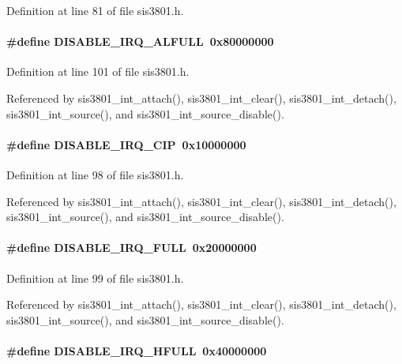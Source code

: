 Definition at line 81 of file sis3801.h.
\paragraph[{DISABLE\_\-IRQ\_\-ALFULL}]{\setlength{\rightskip}{0pt plus 5cm}\#define DISABLE\_\-IRQ\_\-ALFULL~0x80000000}\hfill\label{sis3801_8h_ad4964772785e27e5c5aef46b6187aa5a}


Definition at line 101 of file sis3801.h.

Referenced by sis3801\_\-int\_\-attach(), sis3801\_\-int\_\-clear(), sis3801\_\-int\_\-detach(), sis3801\_\-int\_\-source(), and sis3801\_\-int\_\-source\_\-disable().
\paragraph[{DISABLE\_\-IRQ\_\-CIP}]{\setlength{\rightskip}{0pt plus 5cm}\#define DISABLE\_\-IRQ\_\-CIP~0x10000000}\hfill\label{sis3801_8h_ae7c9598ca47e2097ea4bb6c9b39c5cd8}


Definition at line 98 of file sis3801.h.

Referenced by sis3801\_\-int\_\-attach(), sis3801\_\-int\_\-clear(), sis3801\_\-int\_\-detach(), sis3801\_\-int\_\-source(), and sis3801\_\-int\_\-source\_\-disable().
\paragraph[{DISABLE\_\-IRQ\_\-FULL}]{\setlength{\rightskip}{0pt plus 5cm}\#define DISABLE\_\-IRQ\_\-FULL~0x20000000}\hfill\label{sis3801_8h_a0c1aff27bc224d6bf77187fdc2c29ba1}


Definition at line 99 of file sis3801.h.

Referenced by sis3801\_\-int\_\-attach(), sis3801\_\-int\_\-clear(), sis3801\_\-int\_\-detach(), sis3801\_\-int\_\-source(), and sis3801\_\-int\_\-source\_\-disable().
\paragraph[{DISABLE\_\-IRQ\_\-HFULL}]{\setlength{\rightskip}{0pt plus 5cm}\#define DISABLE\_\-IRQ\_\-HFULL~0x40000000}\hfill\label{sis3801_8h_a16524c516879de51d68b14e58e5af08e}


